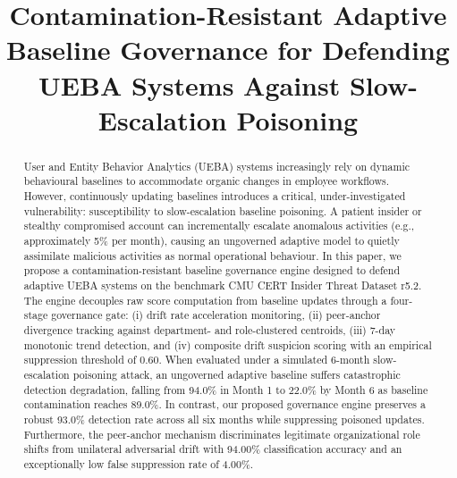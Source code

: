 \documentclass[conference]{IEEEtran}
\begin{document}
\title{Contamination-Resistant Adaptive Baseline Governance for Defending UEBA Systems Against Slow-Escalation Poisoning}

\author{
}

\maketitle

\begin{abstract}
User and Entity Behavior Analytics (UEBA) systems increasingly rely on dynamic behavioural baselines to accommodate organic changes in employee workflows. However, continuously updating baselines introduces a critical, under-investigated vulnerability: susceptibility to slow-escalation baseline poisoning. A patient insider or stealthy compromised account can incrementally escalate anomalous activities (e.g., approximately 5\% per month), causing an ungoverned adaptive model to quietly assimilate malicious activities as normal operational behaviour. In this paper, we propose a contamination-resistant baseline governance engine designed to defend adaptive UEBA systems on the benchmark CMU CERT Insider Threat Dataset r5.2. The engine decouples raw score computation from baseline updates through a four-stage governance gate: (i) drift rate acceleration monitoring, (ii) peer-anchor divergence tracking against department- and role-clustered centroids, (iii) 7-day monotonic trend detection, and (iv) composite drift suspicion scoring with an empirical suppression threshold of 0.60. When evaluated under a simulated 6-month slow-escalation poisoning attack, an ungoverned adaptive baseline suffers catastrophic detection degradation, falling from 94.0\% in Month 1 to 22.0\% by Month 6 as baseline contamination reaches 89.0\%. In contrast, our proposed governance engine preserves a robust 93.0\% detection rate across all six months while suppressing poisoned updates. Furthermore, the peer-anchor mechanism discriminates legitimate organizational role shifts from unilateral adversarial drift with 94.00\% classification accuracy and an exceptionally low false suppression rate of 4.00\%.
\end{abstract}
\end{document}
